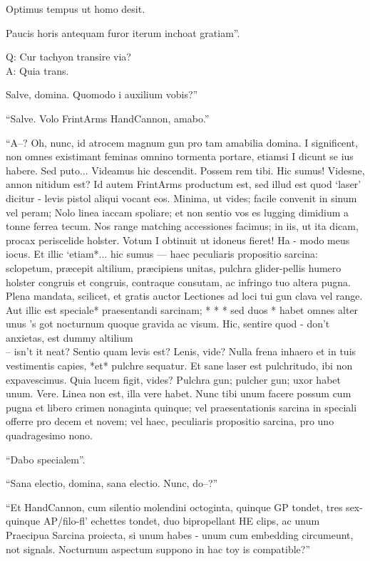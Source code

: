 \documentclass[titlepage,12pt]{memoir}
\begin{document}
Optimus tempus ut homo desit.

Paucis horis antequam furor iterum inchoat gratiam”.

Q: Cur tachyon transire via?\\
A: Quia trans.

Salve, domina. Quomodo i auxilium vobis?”

“Salve. Volo FrintArms HandCannon, amabo.”

“A--? Oh, nunc, id atrocem magnum gun pro tam amabilia domina. I
significent, non omnes existimant feminas omnino tormenta portare, etiamsi I
dicunt se ius habere. Sed puto... Videamus
hic descendit. Possem rem tibi. Hic sumus!
Videsne, annon nitidum est? Id autem FrintArms productum est,
sed illud est quod ‘laser’ dicitur - levis pistol aliqui vocant
eos. Minima, ut vides; facile convenit in sinum vel peram; Nolo
linea iaccam spoliare; et non sentio vos es lugging dimidium a
tonne ferrea tecum. Nos range matching accessiones facimus;
in iis, ut ita dicam, procax periscelide holster. Votum I
obtinuit ut idoneus fieret! Ha - modo meus iocus. Et
illic ‘etiam*... hic sumus — haec peculiaris propositio sarcina: sclopetum,
præcepit altilium, præcipiens unitas, pulchra glider-pellis humero holster
congruis et congruis, contraque consutam, ac infringo tuo
altera pugna. Plena mandata, scilicet, et gratis auctor
Lectiones ad loci tui gun clava vel range. Aut illic est speciale*
praesentandi sarcinam; * * * sed duos * habet omnes alter unus ’s got
nocturnum quoque gravida ac visum. Hic, sentire quod - don’t
anxietas, est dummy altilium \\-- isn’t it neat? Sentio quam levis est?
Lenis, vide? Nulla frena inhaero et in tuis vestimentis capies, *et*
pulchre sequatur. Et sane laser est pulchritudo, ibi
non expavescimus. Quia lucem figit, vides? Pulchra gun;
pulcher gun; uxor habet unum. Vere. Linea non est, illa
vere habet. Nunc tibi unum facere possum cum pugna et libero
crimen nonaginta quinque; vel praesentationis sarcina in speciali
offerre pro decem et novem; vel haec, peculiaris propositio sarcina, pro
uno quadragesimo nono.

“Dabo specialem”.

“Sana electio, domina, sana electio. Nunc, do--?”

“Et HandCannon, cum silentio molendini octoginta, quinque GP tondet, tres
sex-quinque AP/filo-fl’ echettes tondet, duo bipropellant HE clips, ac unum
Praecipua Sarcina proiecta, si unum habes - unum cum embedding
circumeunt, not signals. Nocturnum aspectum suppono in hac toy is
compatible?”
\end{document}
